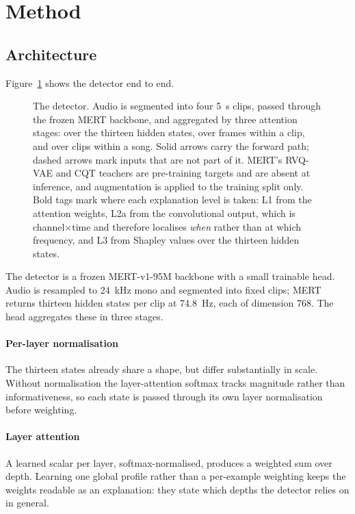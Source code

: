 \section{Method}
\label{sec:method}

\subsection{Architecture}

Figure~\ref{fig:architecture} shows the detector end to end.

\begin{figure}[t]
\centering
\resizebox{\textwidth}{!}{}
\caption{The detector. Audio is segmented into four \SI{5}{\second} clips,
passed through the frozen MERT backbone, and aggregated by three attention
stages: over the thirteen hidden states, over frames within a clip, and over
clips within a song. Solid arrows carry the forward path; dashed arrows mark
inputs that are not part of it. MERT's RVQ-VAE and CQT teachers are
pre-training targets and are absent at inference, and augmentation is applied
to the training split only. Bold tags mark where each explanation level is
taken: L1 from the attention weights, L2a from the convolutional output, which
is channel$\times$time and therefore localises \emph{when} rather than at which
frequency, and L3 from Shapley values over the thirteen hidden states.}
\label{fig:architecture}
\end{figure}

The detector is a frozen MERT-v1-95M backbone with a small trainable head.
Audio is resampled to \SI{24}{\kilo\hertz} mono and segmented into fixed clips;
MERT returns thirteen hidden states per clip at \SI{74.8}{\hertz}, each of
dimension 768. The head aggregates these in three stages.

\paragraph{Per-layer normalisation}
The thirteen states already share a shape, but differ substantially in scale.
Without normalisation the layer-attention softmax tracks magnitude rather than
informativeness, so each state is passed through its own layer normalisation
before weighting.

\paragraph{Layer attention}
A learned scalar per layer, softmax-normalised, produces a weighted sum over
depth. Learning one global profile rather than a per-example weighting keeps the
weights readable as an explanation: they state which depths the detector relies
on in general.

